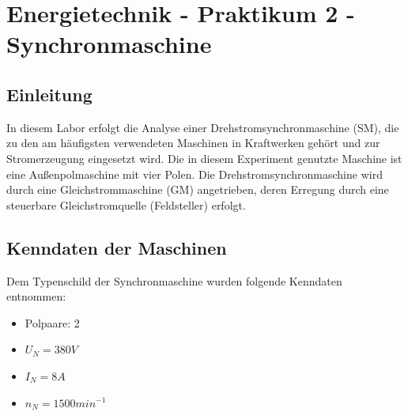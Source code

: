 \documentclass{report}
\begin{document}

\newpage

\tableofcontents

\listoffigures

\newpage

\listoftables


\chapter{Energietechnik - Praktikum 2 - Synchronmaschine}
\section{Einleitung}


In diesem Labor erfolgt die Analyse einer Drehstromsynchronmaschine (SM), die zu den am häufigsten verwendeten Maschinen in Kraftwerken gehört und zur Stromerzeugung eingesetzt wird. Die in diesem Experiment genutzte Maschine ist eine Außenpolmaschine mit vier Polen. Die Drehstromsynchronmaschine wird durch eine Gleichstrommaschine (GM) angetrieben, deren Erregung durch eine steuerbare Gleichstromquelle (Feldsteller) erfolgt.


\section{Kenndaten der Maschinen}

Dem Typenschild der Synchronmaschine wurden folgende Kenndaten entnommen:

\begin{itemize}
	\item Polpaare: 2
	\item $U_{N} = 380V$
	\item $I_{N} = 8A$
	\item $n_{N} = 1500min^{-1}$
\end{itemize}
\end{document}
